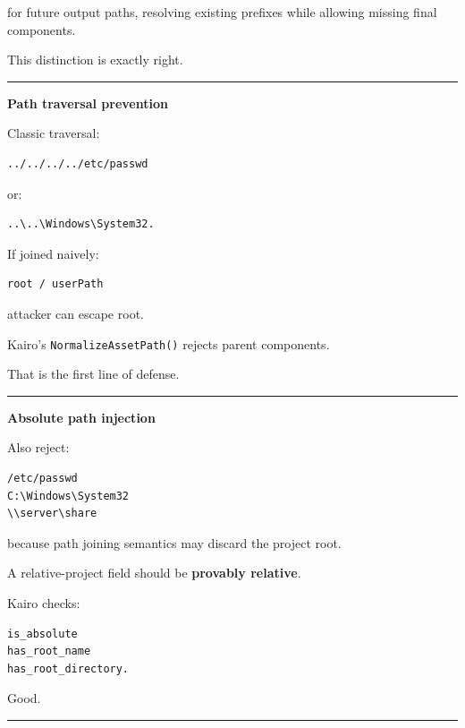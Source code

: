 for future output paths, resolving existing prefixes while allowing missing final components.

This distinction is exactly right.

\begin{center}\rule{0.5\linewidth}{0.5pt}\end{center}

\textbf{Path traversal prevention}

Classic traversal:

\begin{verbatim}
../../../../etc/passwd
\end{verbatim}

or:

\begin{verbatim}
..\..\Windows\System32.
\end{verbatim}

If joined naively:

\begin{verbatim}
root / userPath
\end{verbatim}

attacker can escape root.

Kairo's \texttt{NormalizeAssetPath()} rejects parent components.

That is the first line of defense.

\begin{center}\rule{0.5\linewidth}{0.5pt}\end{center}

\textbf{Absolute path injection}

Also reject:

\begin{verbatim}
/etc/passwd
C:\Windows\System32
\\server\share
\end{verbatim}

because path joining semantics may discard the project root.

A relative-project field should be \textbf{provably relative}.

Kairo checks:

\begin{verbatim}
is_absolute
has_root_name
has_root_directory.
\end{verbatim}

Good.

\begin{center}\rule{0.5\linewidth}{0.5pt}\end{center}

